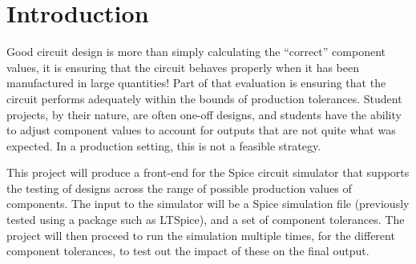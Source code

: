 \documentclass[12pt,a4paper]{article}
\begin{document}
\maketitle
{\hypersetup{linkcolor=black}\tableofcontents}

\section{Introduction}
Good circuit design is more than simply calculating the “correct” component values, it is ensuring that the circuit behaves properly when it has been manufactured in large quantities! Part of that evaluation is ensuring that the circuit performs adequately within the bounds of production tolerances. Student projects, by their nature, are often one-off designs, and students have the ability to adjust component values to account for outputs that are not quite what was expected. In a production setting, this is not a feasible strategy.

This project will produce a front-end for the Spice circuit simulator that supports the testing of designs across the range of possible production values of components. The input to the simulator will be a Spice simulation file (previously tested using a package such as LTSpice), and a set of component tolerances. The project will then proceed to run the simulation multiple times, for the different component tolerances, to test out the impact of these on the final output.
\end{document}
